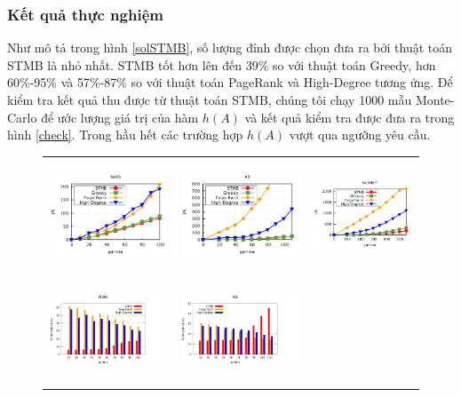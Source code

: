 \subsubsection{Kết quả thực nghiệm} 
Như mô tả trong hình \ref{solSTMB}, số lượng đỉnh được chọn đưa ra bởi thuật toán STMB là nhỏ nhất. STMB tốt hơn lên đến 39\% so với thuật toán Greedy, hơn 60\%-95\% và 57\%-87\% so với thuật toán PageRank và High-Degree tương ứng. Để kiểm tra kết quả thu được từ thuật toán STMB, chúng tôi chạy 1000 mẫu Monte-Carlo để ước lượng giá trị của hàm $h(A)$ và kết quả kiểm tra được đưa ra trong hình \ref{check}. Trong hầu hết các trường hợp $h(A)$ vượt qua ngưỡng yêu cầu.
\begin{figure}
\begin{tabular}{lll}
	\includegraphics[height = 3.2cm]{picture/NetS} &
	\includegraphics[height = 3.2cm]{picture/AS} &   
	\includegraphics[height = 3.2cm]{picture/NetHEPT}
	\\
	\includegraphics[height = 3.2cm]{picture/TimeNetS} &
	\includegraphics[height = 3.2cm]{picture/TimeAS} &   

\end{tabular}
\end{figure}
